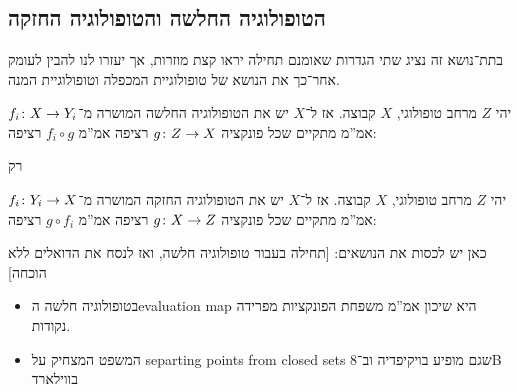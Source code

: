 \documentclass[name=רשימות טופולוגיה כללית]{../../../tex/classes/noChapterMegasumPreamble}
\begin{document}
	\npage
	\section[בניית מרחבים טופולוגיים]{}
	\subsection{\label{ss:strongWeakTopo}הטופולוגיה החלשה והטופולוגיה החזקה}
	בתת־נושא זה נציג שתי הגדרות שאומנם תחילה יראו קצת מוזרות, אך יעזרו לנו להבין לעומק אחר־כך את הנושא של טופולוגיית המכפלה וטופולוגיית המנה. 
	
	
	\begin{Theorem}
		יהי $Z$ מרחב טופולוגי, $X$ קבוצה. אז ל־$X$ יש את הטופולוגיה החלשה המושרה מ־$f_i \colon X \to Y_i$ אמ''מ מתקיים שכל פונקציה $g \colon Z \to X$ רציפה אמ''מ $f_i \circ g$ רציפה: 
		\begin{center}
			\sen{}\she
		\end{center}רק
	\end{Theorem}
	
	\begin{Theorem}
		יהי $Z$ מרחב טופולוגי, $X$ קבוצה. אז ל־$X$ יש את הטופולוגיה החזקה המושרה מ־$f_i \colon Y_i \to X$ אמ''מ מתקיים שכל פונקציה $g \colon X \to Z$ רציפה אמ''מ $g \circ f_i$ רציפה:
		\begin{center}
			\sen{}\she
		\end{center}
	\end{Theorem}
	כאן יש לכסות את הנושאים: [תחילה בעבור טופולוגיה חלשה, ואז לנסח את הדואלים ללא הוכחה]
	\begin{itemize}
		\item בטופולוגיה חלשה הevaluation map היא שיכון אמ''מ משפחת הפונקציות מפרידה נקודות. 
		\item המשפט המצחיק על separting points from closed sets שגם מופיע בויקיפדיה וב־8B בווילארד
	\end{itemize}
	
\end{document}
